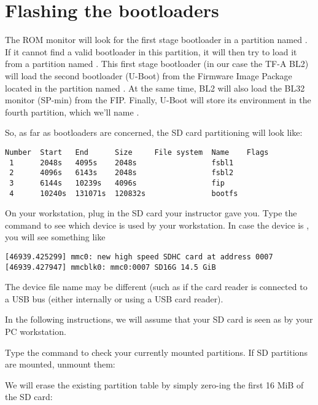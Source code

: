 \section{Flashing the bootloaders}

The ROM monitor will look for the first stage bootloader in a
partition named . If it cannot find a valid bootloader in
this partition, it will then try to load it from a partition named
. This first stage bootloader (in our case the TF-A BL2)
will load the second bootloader (U-Boot) from the Firmware Image
Package located in the partition named . At the same time,
BL2 will also load the BL32 monitor (SP-min) from the FIP. Finally,
U-Boot will store its environment in the fourth partition, which we'll
name .

So, as far as bootloaders are concerned, the SD card partitioning will
look like:

\begin{verbatim}
Number  Start   End      Size     File system  Name    Flags
 1      2048s   4095s    2048s                 fsbl1
 2      4096s   6143s    2048s                 fsbl2
 3      6144s   10239s   4096s                 fip
 4      10240s  131071s  120832s               bootfs
\end{verbatim}

On your workstation, plug in the SD card your instructor gave you. Type
the  command to see which device is used by your
workstation. In case the device is , you will see
something like

\begin{verbatim}
[46939.425299] mmc0: new high speed SDHC card at address 0007
[46939.427947] mmcblk0: mmc0:0007 SD16G 14.5 GiB
\end{verbatim}

The device file name may be different (such as 
if the card reader is connected to a USB bus (either internally
or using a USB card reader).

In the following instructions, we will assume that your SD card is
seen as  by your PC workstation.

Type the  command to check your currently mounted
partitions. If SD partitions are mounted, unmount them:


We will erase the existing partition table by simply zero-ing the
first 16 MiB of the SD card:

